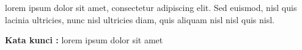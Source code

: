 \begin{abstractind}

lorem ipsum dolor sit amet, consectetur adipiscing elit. Sed euismod, nisl quis lacinia ultricies, nunc nisl ultricies diam, quis aliquam nisl nisl quis nisl.

\bigskip
\noindent
\textbf{Kata kunci :} lorem ipsum dolor sit amet
\end{abstractind}